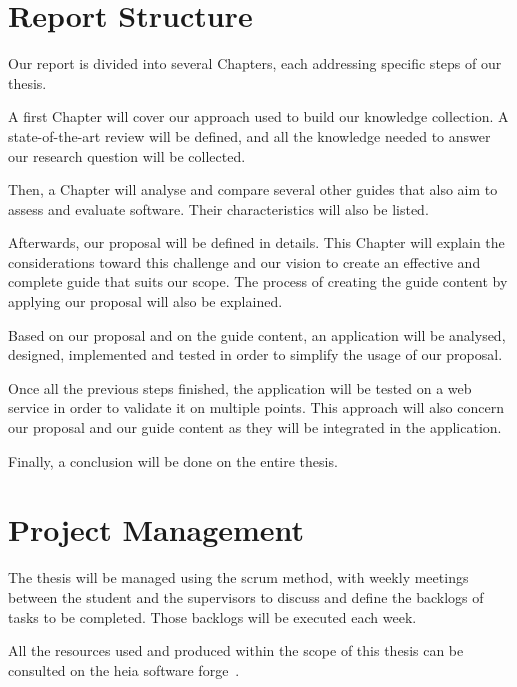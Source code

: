 \section{Report Structure}
\label{sec:introduction_structure}

Our report is divided into several Chapters, each addressing specific steps of our thesis.

A first Chapter will cover our approach used to build our knowledge collection. A state-of-the-art review will be defined, and all the knowledge needed to answer our research question will be collected.

Then, a Chapter will analyse and compare several other guides that also aim to assess and evaluate software. Their characteristics will also be listed.

Afterwards, our proposal will be defined in details. This Chapter will explain the considerations toward this challenge and our vision to create an effective and complete guide that suits our scope. The process of creating the guide content by applying our proposal will also be explained.

Based on our proposal and on the guide content, an application will be analysed, designed, implemented and tested in order to simplify the usage of our proposal.

Once all the previous steps finished, the application will be tested on a web service in order to validate it on multiple points. This approach will also concern our proposal and our guide content as they will be integrated in the application.

Finally, a conclusion will be done on the entire thesis.

\section{Project Management}
\label{sec:introduction_management}

The thesis will be managed using the \gls{scrum} method, with weekly meetings between the student and the supervisors to discuss and define the backlogs of tasks to be completed. Those backlogs will be executed each week.

All the resources used and produced within the scope of this thesis can be consulted on the \gls{heia} software forge~\cite{mt-forge}.